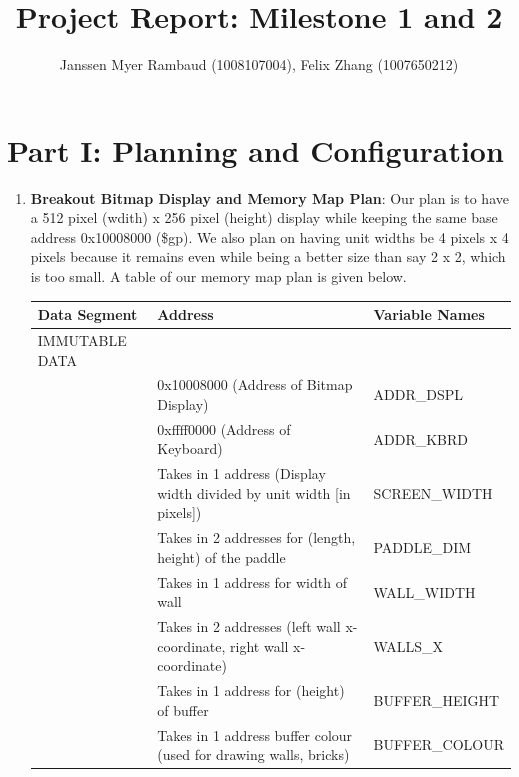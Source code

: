 \documentclass{article}
\title{Project Report: Milestone 1 and 2}
\author{Janssen Myer Rambaud (1008107004), Felix Zhang (1007650212)}
\begin{document}
\maketitle

\section{Part I: Planning and Configuration}

\begin{enumerate}
\item \textbf{Breakout Bitmap Display and Memory Map Plan}: 
Our plan is to have a 512 pixel (wdith) x 256 pixel (height) display while keeping the same base address 0x10008000 (\$gp). 
We also plan on having unit widths be 4 pixels x 4 pixels because it remains even while being a better size than say 2 x 2, which is too small.
A table of our memory map plan is given below.
\begin{table}[ht!]
\begin{tabular}{|l|l|l|}
\hline
Data Segment     & Address                                                           & Variable Names           \\ \hline
IMMUTABLE DATA   &                                                                   &                \\ \hline
                 & 0x10008000 (Address of Bitmap Display)                            & ADDR\_DSPL    \\ \hline
                 & 0xffff0000 (Address of Keyboard)                                  & ADDR\_KBRD     \\ \hline
                 & Takes in 1 address (Display width divided by unit width [in pixels])           & SCREEN\_WIDTH  \\ \hline
                 & Takes in 2 addresses for (length, height) of the paddle                                           & PADDLE\_DIM    \\ \hline
                 & Takes in 1 address for width of wall                                           & WALL\_WIDTH    \\ \hline
                 & Takes in 2 addresses (left wall x-coordinate, right wall x-coordinate)                                 & WALLS\_X     \\ \hline
                                  & Takes in 1 address for (height) of buffer                                                           & BUFFER\_HEIGHT \\ \hline
                 & Takes in 1 address buffer colour (used for drawing walls, bricks)              & BUFFER\_COLOUR \\ \hline

\end{tabular}
\end{table}
\end{enumerate}
\end{document}
